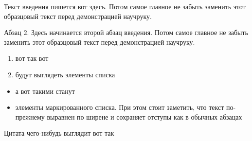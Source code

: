 \label{sec:into}

Текст введения пишется вот здесь. Потом самое главное не забыть заменить этот образцовый текст перед демонстрацией научруку.

Абзац 2. Здесь начинается второй абзац введения. Потом самое главное не забыть заменить этот образцовый текст перед демонстрацией научруку.

\begin{enumerate}
	\item вот так вот
	
	\item будут выглядеть элементы списка
\end{enumerate}

\begin{itemize}
	\item а вот такими станут
	\item элементы маркированного списка. При этом стоит заметить, что текст по-прежнему выравнен по ширене и сохраняет отступы как в обычных абзацах
\end{itemize}

Цитата чего-нибудь выглядит вот так \cite{full-speed-fuzzing}